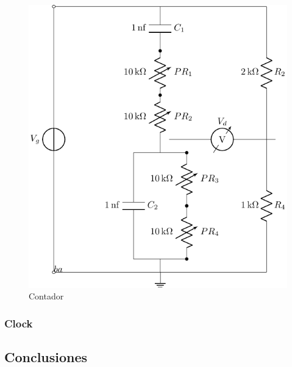 \begin{figure}[H]
\centering
\includegraphics[scale=0.8]{Ejercicio8/Circuitos/Contador&Display.pdf}
\caption{Contador}
\label{fig:Contador&Display}
\end{figure}

\subsubsection{Clock}



\subsection{Conclusiones}